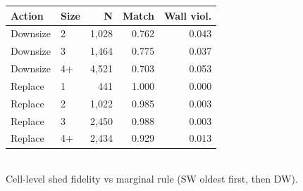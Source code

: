 \begin{table}[ht]
\centering
\small
\renewcommand{\arraystretch}{1.15}
\begin{tabular}{llrrr}
\hline
Action & Size & N & Match & Wall viol. \\
\hline
Downsize & 2 & 1,028 & 0.762 & 0.043 \\
Downsize & 3 & 1,464 & 0.775 & 0.037 \\
Downsize & 4+ & 4,521 & 0.703 & 0.053 \\
Replace & 1 &   441 & 1.000 & 0.000 \\
Replace & 2 & 1,022 & 0.985 & 0.003 \\
Replace & 3 & 2,450 & 0.988 & 0.003 \\
Replace & 4+ & 2,434 & 0.929 & 0.013 \\
\hline
\end{tabular}
\\[2pt]{\footnotesize Cell-level shed fidelity vs marginal rule (SW oldest first, then DW).}
\end{table}

